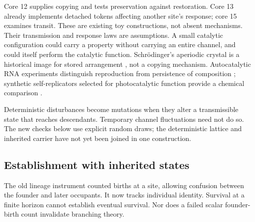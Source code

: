 Core 12 supplies copying and tests preservation against restoration. Core 13
already implements detached tokens affecting another site's response; core 15
examines transit. These are existing toy constructions, not absent mechanisms.
Their transmission and response laws are assumptions. A small catalytic
configuration could carry a property without carrying an entire channel, and
could itself perform the catalytic function. Schr\"odinger's aperiodic crystal
is a historical image for stored arrangement \cite{schrodinger}, not a copying
mechanism. Autocatalytic RNA experiments distinguish reproduction from persistence
of composition \cite{ameta}; synthetic self-replicators selected for photocatalytic
function provide a chemical comparison \cite{photocatalysis}.

Deterministic disturbances become mutations when they alter a transmissible state
that reaches descendants. Temporary channel fluctuations need not do so. The new
checks below use explicit random draws; the deterministic lattice and inherited
carrier have not yet been joined in one construction.

\subsection{Establishment with inherited states}

The old lineage instrument counted births at a site, allowing confusion between
the founder and later occupants. It now tracks individual identity. Survival at
a finite horizon cannot establish eventual survival. Nor does a failed scalar
founder-birth count invalidate branching theory.

